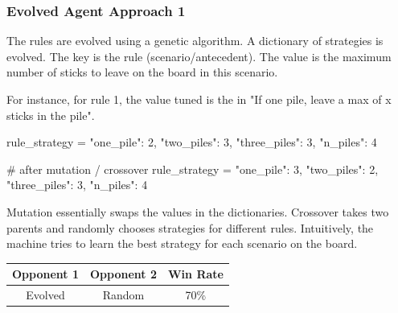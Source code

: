 \subsubsection{Evolved Agent Approach 1}

The rules are evolved using a genetic algorithm. A dictionary of strategies is evolved. The key is the rule (scenario/antecedent). The value is the maximum number of sticks to leave on the board in this scenario.

For instance, for rule 1, the value tuned is the
 in "If one pile, leave a max of x sticks in the pile".

\begin{markdown}
    rule_strategy = {
        "one_pile": 2,
        "two_piles": 3,
        "three_piles": 3,
        "n_piles": 4
    }

    # after mutation / crossover
    rule_strategy = {
        "one_pile": 3,
        "two_piles": 2,
        "three_piles": 3,
        "n_piles": 4
    }

\end{markdown}

Mutation essentially swaps the values in the dictionaries. Crossover takes two parents and randomly chooses strategies for different rules. Intuitively, the machine tries to learn the best strategy for each scenario on the board.

\begin{table}
\centering
\begin{tabular}{|c|c|c|}
\hline
Opponent 1 & Opponent 2 & Win Rate \\ \hline
Evolved & Random & 70\% \\ \hline
\end{tabular}
\end{table}

